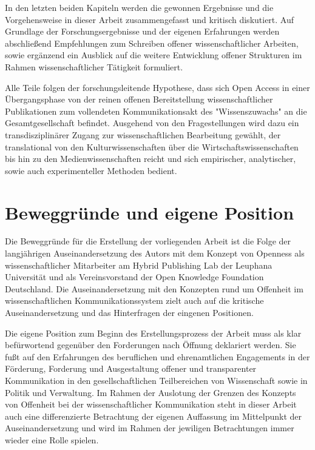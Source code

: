 In den letzten beiden Kapiteln werden die gewonnen Ergebnisse und die Vorgehensweise in dieser Arbeit zusammengefasst und kritisch diskutiert. Auf Grundlage der Forschungsergebnisse und der eigenen Erfahrungen werden abschließend Empfehlungen zum Schreiben offener wissenschaftlicher Arbeiten, sowie ergänzend ein Ausblick auf die weitere Entwicklung offener Strukturen im Rahmen wissenschaftlicher Tätigkeit formuliert.

Alle Teile folgen der forschungsleitende Hypothese, dass sich Open Access in einer Übergangsphase von der reinen offenen Bereitstellung wissenschaftlicher Publikationen zum vollendeten Kommunikationsakt des "Wissenszuwachs" \cite{Luhmann1998} an die Gesamtgesellschaft befindet. Ausgehend von den Fragestellungen wird dazu ein transdisziplinärer Zugang zur wissenschaftlichen Bearbeitung gewählt, der translational von den Kulturwissenschaften über die Wirtschaftswissenschaften bis hin zu den Medienwissenschaften reicht und sich empirischer, analytischer, sowie auch experimenteller Methoden bedient.

\section{Beweggründe und eigene Position}

Die Beweggründe für die Erstellung der vorliegenden Arbeit ist die Folge der langjährigen Auseinandersetzung des Autors mit dem Konzept von Openness als wissenschaftlicher Mitarbeiter am Hybrid Publishing Lab der Leuphana Universität und als Vereinsvorstand der Open Knowledge Foundation Deutschland. Die Auseinandersetzung mit den Konzepten rund um Offenheit im wissenschaftlichen Kommunikationssystem zielt auch auf die kritische Auseinandersetzung und das Hinterfragen der eingenen Positionen.

Die eigene Position zum Beginn des Erstellungsprozess der Arbeit muss als klar befürwortend gegenüber den Forderungen nach Öffnung deklariert werden. Sie fußt auf den Erfahrungen des beruflichen und ehrenamtlichen Engagements in der Förderung, Forderung und Ausgestaltung offener und transparenter Kommunikation in den gesellschaftlichen Teilbereichen von Wissenschaft sowie in Politik und Verwaltung. Im Rahmen der Auslotung der Grenzen des Konzepts von Offenheit bei der wissenschaftlicher Kommunikation steht in dieser Arbeit auch eine differenzierte Betrachtung der eigenen Auffassung im Mittelpunkt der Auseinandersetzung und wird im Rahmen der jewiligen Betrachtungen immer wieder eine Rolle spielen.

